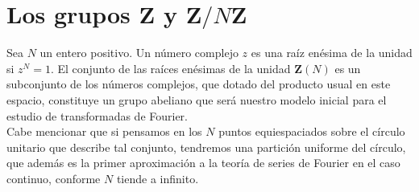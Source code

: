 \documentclass[a4paper,openright,10pt]{article}
\begin{document}
\section{Los grupos $\mathbf{Z}$ y $\mathbf{Z}/N\mathbf{Z}$}
Sea $N$ un entero positivo. Un n\'umero complejo $z$ es una ra\'iz en\'esima de la unidad si $z^{N}=1$.
El conjunto de las ra\'ices en\'esimas de la unidad $\mathbf{Z}(N)$ es un subconjunto de los n\'umeros complejos, que dotado del producto usual en este espacio, constituye un grupo abeliano que será nuestro modelo inicial para el estudio de transformadas de Fourier.\\
Cabe mencionar que si pensamos en los $N$ puntos equiespaciados sobre el c\'irculo unitario que describe tal conjunto, tendremos una partici\'on uniforme del c\'irculo, que adem\'as es la primer aproximaci\'on a la teor\'ia de series de Fourier en el caso continuo, conforme $N$ tiende a infinito.

\end{document}

